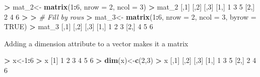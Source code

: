 \documentclass[]{article}
\newenvironment{Shaded}{\begin{snugshade}}{\end{snugshade}}
\newcommand{\KeywordTok}[1]{\textcolor[rgb]{0.13,0.29,0.53}{\textbf{#1}}}
\newcommand{\DataTypeTok}[1]{\textcolor[rgb]{0.13,0.29,0.53}{#1}}
\newcommand{\DecValTok}[1]{\textcolor[rgb]{0.00,0.00,0.81}{#1}}
\newcommand{\StringTok}[1]{\textcolor[rgb]{0.31,0.60,0.02}{#1}}
\newcommand{\CommentTok}[1]{\textcolor[rgb]{0.56,0.35,0.01}{\textit{#1}}}
\newcommand{\OtherTok}[1]{\textcolor[rgb]{0.56,0.35,0.01}{#1}}
\newcommand{\OperatorTok}[1]{\textcolor[rgb]{0.81,0.36,0.00}{\textbf{#1}}}
\newcommand{\ErrorTok}[1]{\textcolor[rgb]{0.64,0.00,0.00}{\textbf{#1}}}
\newcommand{\NormalTok}[1]{#1}
\begin{document}
\begin{Shaded}
\begin{Highlighting}[]
\OperatorTok{>}\StringTok{ }\NormalTok{mat_}\DecValTok{2}\NormalTok{<-}\StringTok{ }\KeywordTok{matrix}\NormalTok{(}\DecValTok{1}\OperatorTok{:}\DecValTok{6}\NormalTok{, }\DataTypeTok{nrow =} \DecValTok{2}\NormalTok{, }\DataTypeTok{ncol =} \DecValTok{3}\NormalTok{) }
\OperatorTok{>}\StringTok{ }\NormalTok{mat_}\DecValTok{2}
\NormalTok{     [,}\DecValTok{1}\NormalTok{] [,}\DecValTok{2}\NormalTok{] [,}\DecValTok{3}\NormalTok{]}
\NormalTok{[}\DecValTok{1}\NormalTok{,]    }\DecValTok{1}    \DecValTok{3}    \DecValTok{5}
\NormalTok{[}\DecValTok{2}\NormalTok{,]    }\DecValTok{2}    \DecValTok{4}    \DecValTok{6}
\OperatorTok{>}\StringTok{ }
\ErrorTok{>}\StringTok{ }\CommentTok{# Fill by rows}
\ErrorTok{>}\StringTok{ }\NormalTok{mat_}\DecValTok{3}\NormalTok{<-}\StringTok{ }\KeywordTok{matrix}\NormalTok{(}\DecValTok{1}\OperatorTok{:}\DecValTok{6}\NormalTok{, }\DataTypeTok{nrow =} \DecValTok{2}\NormalTok{, }\DataTypeTok{ncol =} \DecValTok{3}\NormalTok{, }\DataTypeTok{byrow =} \OtherTok{TRUE}\NormalTok{) }
\OperatorTok{>}\StringTok{ }\NormalTok{mat_}\DecValTok{3}
\NormalTok{     [,}\DecValTok{1}\NormalTok{] [,}\DecValTok{2}\NormalTok{] [,}\DecValTok{3}\NormalTok{]}
\NormalTok{[}\DecValTok{1}\NormalTok{,]    }\DecValTok{1}    \DecValTok{2}    \DecValTok{3}
\NormalTok{[}\DecValTok{2}\NormalTok{,]    }\DecValTok{4}    \DecValTok{5}    \DecValTok{6}
\end{Highlighting}
\end{Shaded}

Adding a dimension attribute to a vector makes it a matrix

\begin{Shaded}
\begin{Highlighting}[]
\OperatorTok{>}\StringTok{ }\NormalTok{x<-}\DecValTok{1}\OperatorTok{:}\DecValTok{6}
\OperatorTok{>}\StringTok{ }\NormalTok{x}
\NormalTok{[}\DecValTok{1}\NormalTok{] }\DecValTok{1} \DecValTok{2} \DecValTok{3} \DecValTok{4} \DecValTok{5} \DecValTok{6}
\OperatorTok{>}\StringTok{ }\KeywordTok{dim}\NormalTok{(x)<-}\KeywordTok{c}\NormalTok{(}\DecValTok{2}\NormalTok{,}\DecValTok{3}\NormalTok{)}
\OperatorTok{>}\StringTok{ }\NormalTok{x}
\NormalTok{     [,}\DecValTok{1}\NormalTok{] [,}\DecValTok{2}\NormalTok{] [,}\DecValTok{3}\NormalTok{]}
\NormalTok{[}\DecValTok{1}\NormalTok{,]    }\DecValTok{1}    \DecValTok{3}    \DecValTok{5}
\NormalTok{[}\DecValTok{2}\NormalTok{,]    }\DecValTok{2}    \DecValTok{4}    \DecValTok{6}
\end{Highlighting}
\end{Shaded}
\end{document}
